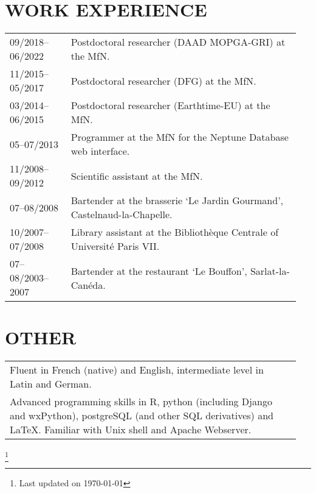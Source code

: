 \documentclass[11pt, a4paper]{article}
\begin{document}
\section{WORK EXPERIENCE}
\begin{longtable}{p{0.2\linewidth} P{0.75\linewidth}}
09/2018--06/2022 & Postdoctoral researcher (DAAD MOPGA-GRI) at the MfN.\\
11/2015--05/2017 & Postdoctoral researcher (DFG) at the MfN.\\
03/2014--06/2015 & Postdoctoral researcher (Earthtime-EU) at the MfN.\\
05--07/2013 & Programmer at the MfN for the Neptune Database web interface.\\
11/2008--09/2012 & Scientific assistant at the MfN.\\
07--08/2008 & Bartender at the brasserie `Le Jardin Gourmand', Castelnaud-la-Chapelle.\\
10/2007--07/2008 & Library assistant at the Biblioth\`{e}que Centrale of Universit\'{e} Paris VII.\\
07--08/2003--2007 & Bartender at the restaurant `Le Bouffon', Sarlat-la-Can\'{e}da.\\
\end{longtable}

\section{OTHER}
\begin{longtable}{P{0.94\linewidth} p{0.01\linewidth}}
Fluent in French (native) and English, intermediate level in Latin and German. & \\
Advanced programming skills in R, python (including Django and wxPython), postgreSQL (and other SQL derivatives) and \LaTeX. Familiar with Unix shell and Apache Webserver. & \\
\end{longtable}

{\let\thefootnote\relax\footnote{Last updated on \today}}
\end{document}
